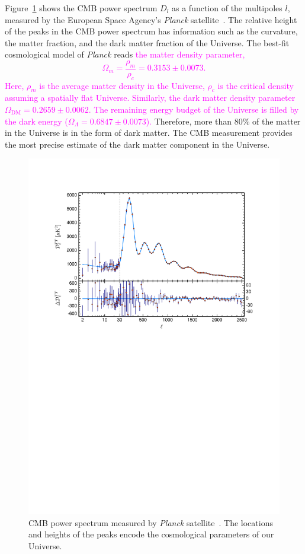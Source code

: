 \documentclass[doublespace,nopageskip]{VTthesis} %
\newcommand{\DS}[1]{\textcolor{magenta}{#1}}
\begin{document}
Figure~\ref{fig:cmb} shows the CMB power spectrum $D_l$ as a function of the multipoles $l$, measured by the European Space Agency's \emph{Planck} satellite~\cite{2020A&A...641A...6P}. The relative height of the peaks in the CMB power spectrum has information such as the curvature, the matter fraction, and the dark matter fraction of the Universe. The best-fit cosmological model of \textit{Planck} reads \DS{the matter density parameter,
\begin{equation}
    \Omega_m = \frac{\rho_m}{\rho_c} = 0.3153 \pm 0.0073.
\end{equation}
Here, $\rho_m$ is the average matter density in the Universe, $\rho_c$ is the critical density assuming a spatially flat Universe. Similarly, the dark matter density parameter $\Omega_\mathrm{DM} = 0.2659 \pm 0.0062$. The remaining energy budget of the Universe is filled by the dark energy ($\Omega_\Lambda = 0.6847 \pm 0.0073$).} Therefore, more than 80\% of the matter in the Universe is in the form of dark matter. The CMB measurement provides the most precise estimate of the dark matter component in the Universe.
\begin{figure}[htb]
    \centering
    \includegraphics[width=\textwidth]{Figures/Intro/Planck_CMB.pdf}
    \caption{CMB power spectrum measured by \emph{Planck} satellite~\cite{2020A&A...641A...6P}. The locations and heights of the peaks encode the cosmological parameters of our Universe.}
    \label{fig:cmb}
\end{figure}
\end{document}
